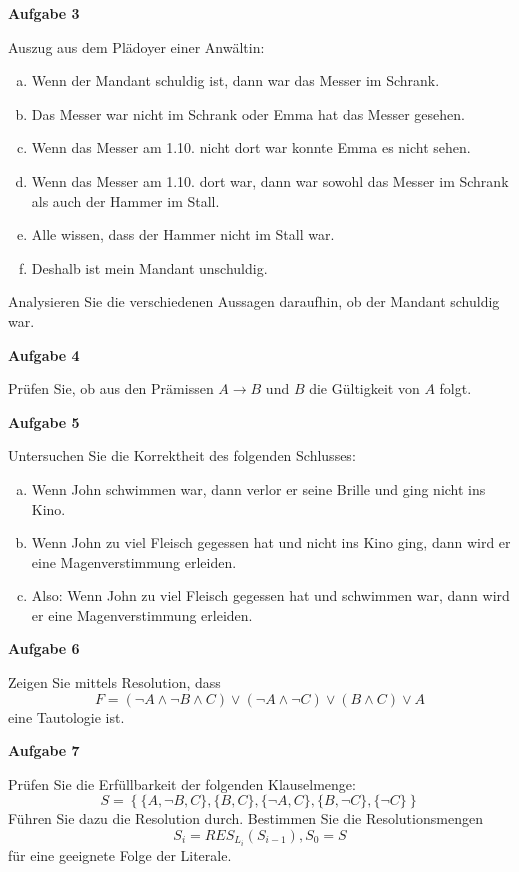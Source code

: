 \documentclass[a4paper,12pt]{article}
\newcommand{\Aufgabe}[1]{
	{
		\vspace*{0.5cm}
		\textsf{\textbf{Aufgabe #1}}
		\vspace*{0.2cm}
		
	}
}
\begin{document}
	\Aufgabe{3}
	Auszug aus dem Plädoyer einer Anwältin:
	\begin{enumerate}[a.]
		\item Wenn der Mandant schuldig ist, dann war das Messer im Schrank.
		\item Das Messer war nicht im Schrank oder Emma hat das Messer gesehen.
		\item Wenn das Messer am 1.10. nicht dort war konnte Emma es nicht sehen.
		\item Wenn das Messer am 1.10. dort war, dann war sowohl das Messer im Schrank als auch der Hammer im Stall.
		\item Alle wissen, dass der Hammer nicht im Stall war.
		\item Deshalb ist mein Mandant unschuldig.
	\end{enumerate}
	Analysieren Sie die verschiedenen Aussagen daraufhin, ob der Mandant schuldig war.
	
	\Aufgabe{4}
	Prüfen Sie, ob aus den Prämissen $A \rightarrow B$ und $B$ die Gültigkeit von $A$ folgt.
	
	\Aufgabe{5}
	Untersuchen Sie die Korrektheit des folgenden Schlusses:
	\begin{enumerate}[a.]
		\item Wenn John schwimmen war, dann verlor er seine Brille und ging nicht ins Kino.
		\item Wenn John zu viel Fleisch gegessen hat und nicht ins Kino ging, dann wird er eine Magenverstimmung erleiden.
		\item Also: Wenn John zu viel Fleisch gegessen hat und schwimmen war, dann wird er eine Magenverstimmung erleiden.
	\end{enumerate}

	\Aufgabe{6}
	Zeigen Sie mittels Resolution, dass
	$$F=(\neg A \land \neg B \land C) \lor (\neg A \land \neg C) \lor (B \land C) \lor A$$
	eine Tautologie ist.
	
	\Aufgabe{7}
	Prüfen Sie die Erfüllbarkeit der folgenden Klauselmenge:
	$$S = \left\{\{A, \neg B, C\}, \{B, C\}, \{\neg A, C\}, \{B, \neg C\}, \{\neg C\}\right\}$$
	Führen Sie dazu die Resolution durch. Bestimmen Sie die Resolutionsmengen $$S_i=RES_{L_i}(S_{i-1}), S_0=S$$ für eine geeignete Folge der Literale.
\end{document}
